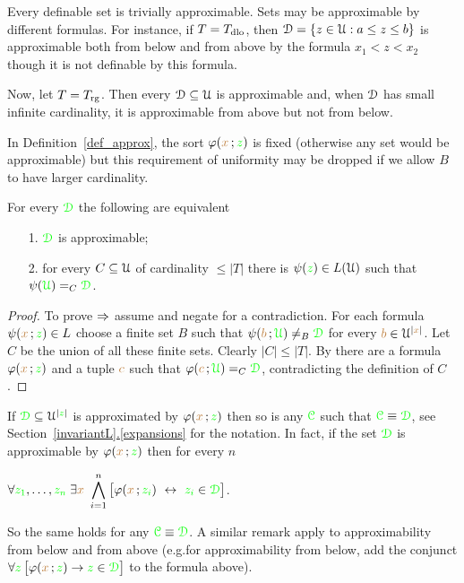 \documentclass[creche.tex]{subfiles}
\begin{document}
\begin{example}
Every definable set is trivially approximable.
Sets may be approximable by different formulas.
For instance, if $T=T_{\rm dlo}$, then $\EuScript D=\{z\in\EuScript U:a\le z\le b\}$ is approximable both from below and from above by the formula $x_1<z<x_2$ though it is not definable by this formula.

Now, let $T=T_{\rm rg}$.
Then every $\EuScript D\subseteq\EuScript U$ is approximable and, when $\EuScript D$ has small infinite cardinality, it is approximable from above but not from below.\QED
\end{example}

In Definition~\ref{def_approx}, the sort $\varphi({\color{brown} x}\,;{\color{green} z})$ is fixed (otherwise any set would be approximable) but this requirement of uniformity may be dropped if we allow $B$ to have larger cardinality.

\begin{proposition}\label{lem_approx_nonunif}
For every ${\color{green}\EuScript D}$ the following are equivalent
\begin{itemize}
\item[1.] ${\color{green}\EuScript D}$ is approximable;
\item[2.] for every $C\subseteq\EuScript U$ of cardinality $\le|T|$ there is $\psi({\color{green} z})\in L(\EuScript U)$ such that $\psi({\color{green}\EuScript U})=_C{\color{green}\EuScript D}$.
\end{itemize}
\end{proposition}

\begin{proof}
To prove $\Rightarrow$ assume  and negate  for a contradiction.
For each formula $\psi({\color{brown} x}\,;{\color{green} z})\in L$ choose a finite set $B$ such that $\psi({\color{brown} b}\,;{\color{green}\EuScript U})\neq_B{\color{green}\EuScript D}$ for every ${\color{brown} b}\in\EuScript U^{|{\color{brown} x}|}$.
Let $C$ be the union of all these finite sets.
Clearly $|C|\le|T|$.
By  there are a formula $\varphi({\color{brown} x}\,;{\color{green} z})$ and a tuple ${\color{brown} c}$ such that $\varphi({\color{brown} c}\,;{\color{green}\EuScript U})=_C{\color{green}\EuScript D}$, contradicting the definition of $C$.
\end{proof}



\begin{remark}\label{prop_approx_el_eq}
If ${\color{green}\EuScript D}\subseteq\EuScript U^{|{\color{green} z}|}$ is approximated by $\varphi({\color{brown} x}\,;{\color{green} z})$ then so is any ${\color{green}\EuScript C}$ such that ${\color{green}\EuScript C}\equiv{\color{green}\EuScript D}$, see Section~\hyperref[expansions]{\ref*{invariantL}.\ref*{expansions}} for the notation.
In fact, if the set ${\color{green}\EuScript D}$ is approximable by $\varphi({\color{brown} x}\,;{\color{green} z})$ then for every $n$

\hfil$\displaystyle\A {\gr z_1},\dots,{\gr z_n}\;\E {\mr x}\ \bigwedge^n_{i=1}\big[\phi({\mr x}\,;{\gr z_i})\ \iff\ {\gr z_i}\in{\gr \D}\big]$.


So the same holds for any ${\color{green}\EuScript C}\equiv{\color{green}\EuScript D}$.
A similar remark apply to approximability from below and from above (e.g.\@ for approximability from below, add the conjunct $\forall {\color{green}z}\,\big[\varphi({\color{brown} x}\,;{\color{green} z})\rightarrow {\color{green}z}\in{\color{green}\EuScript D}\big]$ to the formula above).\QED
\end{remark}
\end{document}
